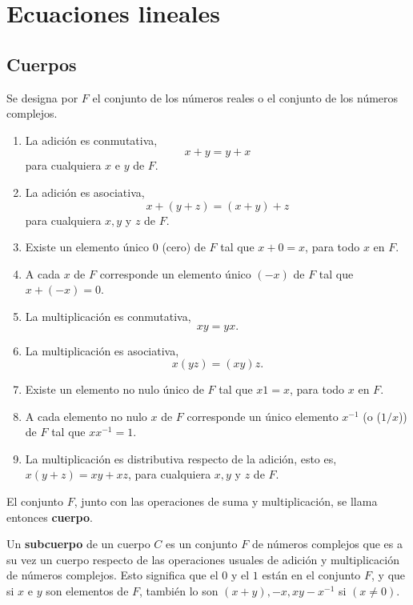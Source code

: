 \chapter{Ecuaciones lineales}

\section{Cuerpos}
Se designa por $F$ el conjunto de los números reales o el conjunto de los números complejos.

    \begin{enumerate}[\bfseries 1.]
	\item La adición es conmutativa,
	    $$x+y=y+x$$
	para cualquiera $x$ e $y$ de $F$.

	\item La adición es asociativa,
	    $$x+(y+z)=(x+y)+z$$
	para cualquiera $x,y$ y $z$ de $F$.

	\item Existe un elemento único $0$ (cero) de $F$ tal que $x+0=x$, para todo $x$ en $F$.

	\item A cada $x$ de $F$ corresponde un elemento único $(-x)$ de $F$ tal que $x+(-x)=0$.

	\item La multiplicación es conmutativa,
	    $$xy=yx.$$

	\item La multiplicación es asociativa,
	    $$x(yz)=(xy)z.$$

	\item Existe un elemento no nulo único de $F$ tal que $x1=x$, para todo $x$ en $F$.

	\item A cada elemento no nulo $x$ de $F$ corresponde un único elemento $x^{-1}$ (o ($1/x$)) de $F$ tal que $xx^{-1}=1.$

	\item La multiplicación es distributiva respecto de la adición, esto es, $x(y+z)=xy+xz$, para cualquiera $x,y$ y $z$ de $F$.
	
    \end{enumerate}

    El conjunto $F$, junto con  las operaciones de suma y multiplicación, se llama entonces \textbf{cuerpo}.

    Un \textbf{subcuerpo} de un cuerpo $C$ es un conjunto $F$ de números complejos que es a su vez un cuerpo respecto de las operaciones usuales de adición y multiplicación  de números complejos. Esto significa que el $0$ y el $1$ están en el conjunto $F$, y que si $x$ e $y$ son elementos de $F$, también lo son $(x+y), -x,xy-x^{-1}$ si $(x\neq 0)$.


